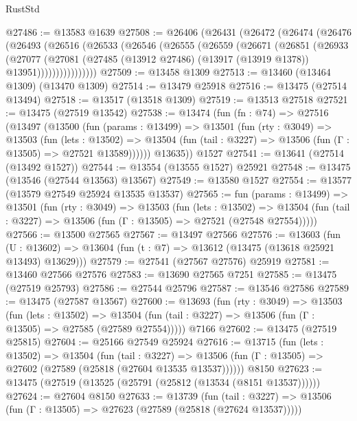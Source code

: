 \begin{lexlean}{RustStd}
\begin{coremodule}
@27486 := @13583 @1639
@27508 := @26406
    (@26431
      (@26472
        (@26474
          (@26476
            (@26493
              (@26516
                (@26533
                  (@26546
                    (@26555
                      (@26559
                        (@26671
                          (@26851
                            (@26933
                              (@27077
                                (@27081
                                  (@27485
                                    (@13912 @27486)
                                    (@13917 (@13919 @1378))
                                    @13951))))))))))))))))
@27509 := @13458 @1309
@27513 := @13460 (@13464 @1309) (@13470 @1309)
@27514 := @13479 @25918
@27516 := @13475 (@27514 @13494)
@27518 := @13517 (@13518 @1309)
@27519 := @13513 @27518
@27521 := @13475 (@27519 @13542)
@27538 := @13474
    (fun (fn : @74) =>
    @27516
      (@13497
        (@13500
          (fun (params : @13499) =>
          @13501
            (fun (rty : @3049) =>
            @13503
              (fun (lets : @13502) =>
              @13504 (fun (tail : @3227) => @13506 (fun (Γ : @13505) => @27521 @13589))))))
        @13635))
    @1527
@27541 := @13641 (@27514 (@13492 @1527))
@27544 := @13554 (@13555 @1527) @25921
@27548 := @13475 (@13546 (@27544 @13563) @13567)
@27549 := @13580 @1527
@27554 := @13577 (@13579 @27549 @25924 @13535 @13537)
@27565 := fun (params : @13499) =>
  @13501
    (fun (rty : @3049) =>
    @13503
      (fun (lets : @13502) =>
      @13504 (fun (tail : @3227) => @13506 (fun (Γ : @13505) => @27521 (@27548 @27554)))))
@27566 := @13500 @27565
@27567 := @13497 @27566
@27576 := @13603
    (fun (U : @13602) => @13604 (fun (t : @7) => @13612 (@13475 (@13618 @25921 @13493) @13629)))
@27579 := @27541 (@27567 @27576) @25919
@27581 := @13460 @27566 @27576
@27583 := @13690 @27565 @7251
@27585 := @13475 (@27519 @25793)
@27586 := @27544 @25796
@27587 := @13546 @27586
@27589 := @13475 (@27587 @13567)
@27600 := @13693
    (fun (rty : @3049) =>
    @13503
      (fun (lets : @13502) =>
      @13504 (fun (tail : @3227) => @13506 (fun (Γ : @13505) => @27585 (@27589 @27554)))))
    @7166
@27602 := @13475 (@27519 @25815)
@27604 := @25166 @27549 @25924
@27616 := @13715
    (fun (lets : @13502) =>
    @13504
      (fun (tail : @3227) =>
      @13506 (fun (Γ : @13505) => @27602 (@27589 (@25818 (@27604 @13535 @13537))))))
    @8150
@27623 := @13475 (@27519 (@13525 (@25791 (@25812 (@13534 (@8151 @13537))))))
@27624 := @27604 @8150
@27633 := @13739
    (fun (tail : @3227) => @13506 (fun (Γ : @13505) => @27623 (@27589 (@25818 (@27624 @13537)))))

\end{coremodule}
\end{lexlean}

